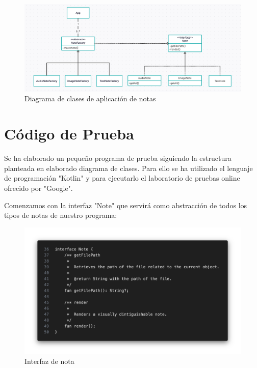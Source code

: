 \documentclass{article}
\begin{document}
        \begin{figure}[H]
            \centerline{\includegraphics[scale=0.3]{uml.png}}
            \caption{Diagrama de clases de aplicación de notas}
            \label{fig:uml}
        \end{figure}

    \section{Código de Prueba}

        Se ha elaborado un pequeño programa de prueba siguiendo la estructura planteada en elaborado
         diagrama de clases. Para ello se ha utilizado el lenguaje de programación "Kotlin" y para
         ejecutarlo el laboratorio de pruebas online ofrecido por "Google".

        Comenzamos con la interfaz "Note" que servirá como abstracción de todos los tipos de
         notas de nuestro programa:

        \begin{figure}[H]
            \centerline{\includegraphics[scale=0.3]{note.png}}
            \caption{Interfaz de nota}
            \label{fig:note}
        \end{figure}
\end{document}
